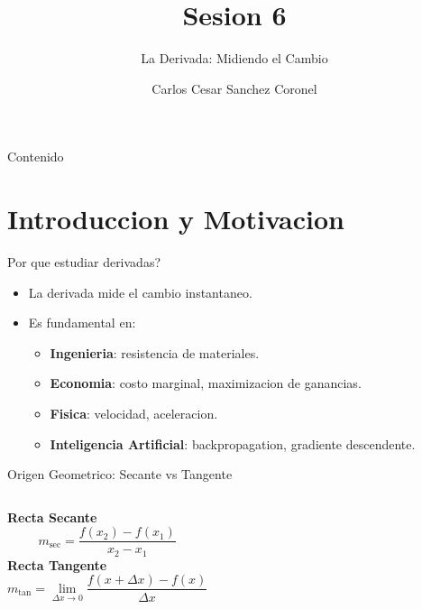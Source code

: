 \documentclass[aspectratio=169, 10pt, xcolor=table]{beamer}
\title[SESION 6 CALCULO]{\textbf{Sesion 6}}
\subtitle{La Derivada: Midiendo el Cambio}
\author[Prof. C. Sanchez]{Carlos Cesar Sanchez Coronel}
\institute{\textbf{CALCULO Y ALGEBRA LINEAL PARA IA}}
\date{}
\begin{document}
\begin{frame}
    \titlepage
\end{frame}

\begin{frame}{Contenido}
    \tableofcontents
\end{frame}

\section{Introduccion y Motivacion}

\begin{frame}{Por que estudiar derivadas?}
    \begin{itemize}
        \item La derivada mide el cambio instantaneo.
        \item Es fundamental en:
        \begin{itemize}
            \item \textbf{Ingenieria}: resistencia de materiales.
            \item \textbf{Economia}: costo marginal, maximizacion de ganancias.
            \item \textbf{Fisica}: velocidad, aceleracion.
            \item \textbf{Inteligencia Artificial}: backpropagation, gradiente descendente.
        \end{itemize}
    \end{itemize}
\end{frame}

\begin{frame}{Origen Geometrico: Secante vs Tangente}
    \begin{columns}[t]
        \textbf{Recta Secante}
        \[
        m_{\text{sec}} = \frac{f(x_2)-f(x_1)}{x_2-x_1}
        \]
        \textbf{Recta Tangente}
        \[
        m_{\text{tan}} = \lim_{\Delta x\to 0} \frac{f(x+\Delta x)-f(x)}{\Delta x}
        \]
    \end{columns}
    \vspace{0.3cm}
    \centering
\end{frame}
\end{document}
